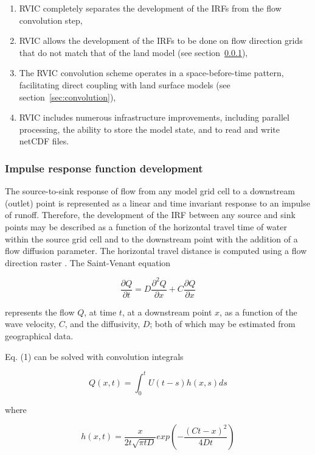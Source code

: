 \documentclass[jgrga, draft]{agutex}
\begin{document}
\begin{article}
\begin{enumerate}
\item RVIC completely separates the development of the IRFs from the flow convolution step,
\item RVIC allows the development of the IRFs to be done on flow direction grids that do not match that of the land model (see section~\ref{sec:irfs}),
\item The RVIC convolution scheme operates in a space-before-time pattern, facilitating direct coupling with land surface models (see section~\ref{sec:convolution}),
\item RVIC includes numerous infrastructure improvements, including parallel processing, the ability to store the model state, and to read and write netCDF files.
\end{enumerate}

\subsubsection{Impulse response function development}
\label{sec:irfs}

The source-to-sink response of flow from any model grid cell to a downstream (outlet) point is represented as a linear and time invariant response to an impulse of runoff.
Therefore, the development of the IRF between any source and sink points may be described as a function of the horizontal travel time of water within the source grid cell and to the downstream point with the addition of a flow diffusion parameter.
The horizontal travel distance is computed using a flow direction raster \citep[e.g.][]{Wu_2011}.
The Saint-Venant equation

 \begin{equation}
     \frac{\partial Q}{\partial t} = D \frac{\partial^2 Q}{\partial x} + C \frac{\partial Q}{\partial x}
 \end{equation}

represents the flow $Q$, at time $t$, at a downstream point $x$, as a function of the wave velocity, $C$, and the diffusivity, $D$; both of which may be estimated from geographical data.

Eq. (1) can be solved with convolution integrals

 \begin{equation}
	Q(x,t) = \int_0^t U(t-s)h(x,s)ds
 \end{equation}

where

 \begin{equation}
	h(x, t) = \frac{x}{2t\sqrt{\pi tD}}exp\left(-\frac{(Ct-x)^2}{4Dt}\right)
 \end{equation}


\end{article}
\end{document}
